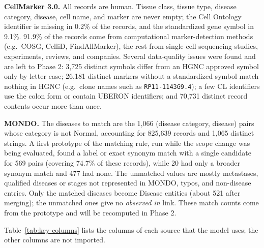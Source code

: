 \medskip\noindent\textbf{CellMarker 3.0.} All records are human. Tissue class, tissue type, disease category, disease, cell name, and marker are never empty; the Cell Ontology identifier is missing in 0.2\% of the records, and the standardized gene symbol in 9.1\%. 91.9\% of the records come from computational marker-detection methods (e.g.\ COSG, CelliD, FindAllMarker), the rest from single-cell sequencing studies, experiments, reviews, and companies. Several data-quality issues were found and are left to Phase 2: 3,725 distinct symbols differ from an HGNC approved symbol only by letter case; 26,181 distinct markers without a standardized symbol match nothing in HGNC (e.g.\ clone names such as \texttt{RP11-1143G9.4}); a few CL identifiers use the colon form or contain UBERON identifiers; and 70,731 distinct record contents occur more than once.

\medskip\noindent\textbf{MONDO.} The diseases to match are the 1,066 (disease category, disease) pairs whose category is not Normal, accounting for 825,639 records and 1,065 distinct strings. A first prototype of the matching rule, run while the scope change was being evaluated, found a label or exact synonym match with a single candidate for 569 pairs (covering 74.7\% of these records), while 20 had only a broader synonym match and 477 had none. The unmatched values are mostly metastases, qualified diseases or stages not represented in MONDO, typos, and non-disease entries. Only the matched diseases become Disease entities (about 521 after merging); the unmatched ones give no \emph{observed in} link. These match counts come from the prototype and will be recomputed in Phase 2.

\noindent Table~\ref{tab:key-columns} lists the columns of each source that the model uses; the other columns are not imported.

